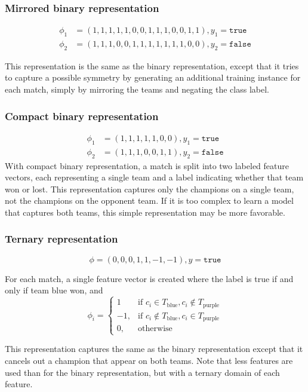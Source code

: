 \subsubsection{Mirrored binary representation}

\begin{align*}
  \phi_1 &= (1,1,1,1,1,0,0,1,1,1,0,0,1,1), y_1 = \texttt{true}\\
  \phi_2 &= (1,1,1,0,0,1,1,1,1,1,1,1,0,0), y_2 = \texttt{false}
\end{align*}

This representation is the same as the binary representation, except that it tries to capture a possible symmetry by generating an additional training instance for each match, simply by mirroring the teams and negating the class label.

\subsubsection{Compact binary representation}
\begin{align*}
  \phi_1 &= (1,1,1,1,1,0,0), y_1 = \texttt{true} \\
  \phi_2 &= (1,1,1,0,0,1,1), y_2 =\texttt{false}
\end{align*}
With compact binary representation, a match is split into two labeled feature vectors, each representing a single team and a label indicating whether that team won or lost.
This representation captures only the champions on a single team, not the champions on the opponent team.
If it is too complex to learn a model that captures both teams, this simple representation may be more favorable.

\subsubsection{Ternary representation}

\[\phi = (0,0,0,1,1,-1,-1), y = \texttt{true}\]

For each match, a single feature vector is created where the label is true if and only if team blue won, and
\[
    \phi_i = 
\begin{cases}
    1 				 & \text{if } c_i \in T_\text{blue}, c_i \not\in T_\text{purple}\\
    -1,              & \text{if } c_i \not\in T_\text{blue}, c_i \in T_\text{purple}\\
    0,              & \text{otherwise}
\end{cases}
\]

This representation captures the same as the binary representation except that it cancels out a champion that appear on both teams.
Note that less features are used than for the binary representation, but with a ternary domain of each feature.


